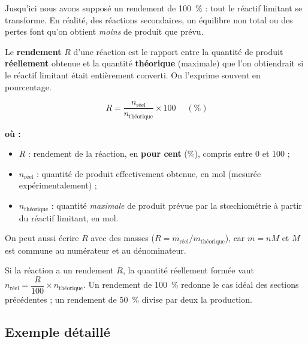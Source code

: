 \documentclass[11pt,a4paper]{article}
\newenvironment{ou}{%
  \par\smallskip\noindent\textbf{où :}\nopagebreak
  \begin{itemize}[leftmargin=1.8em,topsep=2pt,itemsep=1.5pt,parsep=0pt]}%
  {\end{itemize}}
\begin{document}
Jusqu'ici nous avons supposé un rendement de \SI{100}{\percent} : tout le réactif limitant se
transforme. En réalité, des réactions secondaires, un équilibre non total ou des pertes font qu'on
obtient \emph{moins} de produit que prévu.

\begin{definition}
Le \textbf{rendement} $R$ d'une réaction est le rapport entre la quantité de produit
\textbf{réellement} obtenue et la quantité \textbf{théorique} (maximale) que l'on obtiendrait si le
réactif limitant était entièrement converti. On l'exprime souvent en pourcentage.
\end{definition}

\begin{formule}[rendement]
\[
\boxed{\;R=\dfrac{n_{\text{réel}}}{n_{\text{théorique}}}\times 100\;}\quad(\si{\percent})
\]
\begin{ou}
  \item $R$ : rendement de la réaction, en \textbf{pour cent} (\si{\percent}), compris entre 0 et 100 ;
  \item $n_{\text{réel}}$ : quantité de produit effectivement obtenue, en \si{\mole} (mesurée
        expérimentalement) ;
  \item $n_{\text{théorique}}$ : quantité \emph{maximale} de produit prévue par la stœchiométrie à
        partir du réactif limitant, en \si{\mole}.
\end{ou}
On peut aussi écrire $R$ avec des masses ($R=m_{\text{réel}}/m_{\text{théorique}}$), car
$m=nM$ et $M$ est commune au numérateur et au dénominateur.
\end{formule}

\begin{remarque}
Si la réaction a un rendement $R$, la quantité réellement formée vaut
$n_{\text{réel}}=\dfrac{R}{100}\times n_{\text{théorique}}$. Un rendement de \SI{100}{\percent}
redonne le cas idéal des sections précédentes ; un rendement de \SI{50}{\percent} divise par deux la
production.
\end{remarque}

\subsection{Exemple détaillé}
\end{document}
